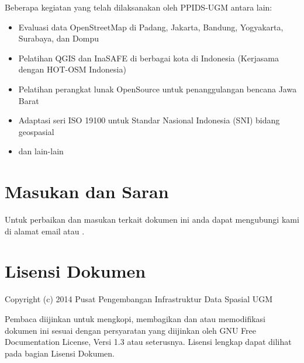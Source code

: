 \documentclass[letterpaper,10pt,english]{sphinxmanual}
\begin{document}
Beberapa kegiatan yang telah dilaksanakan oleh PPIDS-UGM antara lain:
\begin{itemize}
\item {} 
Evaluasi data OpenStreetMap di Padang, Jakarta, Bandung, Yogyakarta,
Surabaya, dan Dompu

\item {} 
Pelatihan QGIS dan InaSAFE di berbagai kota di Indonesia (Kerjasama dengan
HOT-OSM Indonesia)

\item {} 
Pelatihan perangkat lunak OpenSource untuk penanggulangan bencana Jawa Barat

\item {} 
Adaptasi seri ISO 19100 untuk Standar Nasional Indonesia (SNI) bidang
geospasial

\item {} 
dan lain-lain

\end{itemize}


\chapter{Masukan dan Saran}
\label{index:masukan-saran}\label{index:masukan-dan-saran}
Untuk perbaikan dan masukan terkait dokumen ini anda dapat mengubungi kami
di alamat email  atau .


\chapter{Lisensi Dokumen}
\label{index:lisensi-dokumen}\label{index:lisensi}
Copyright (c) 2014 Pusat Pengembangan Infrastruktur Data Spasial UGM

Pembaca diijinkan untuk mengkopi, membagikan dan atau memodifikasi dokumen
ini sesuai dengan persyaratan yang diijinkan oleh GNU Free Documentation
License, Versi 1.3 atau seterusnya. Lisensi lengkap dapat dilihat pada bagian
Lisensi Dokumen.
\pagebreak[4]


\renewcommand{\indexname}{Index}
\printindex
\end{document}
